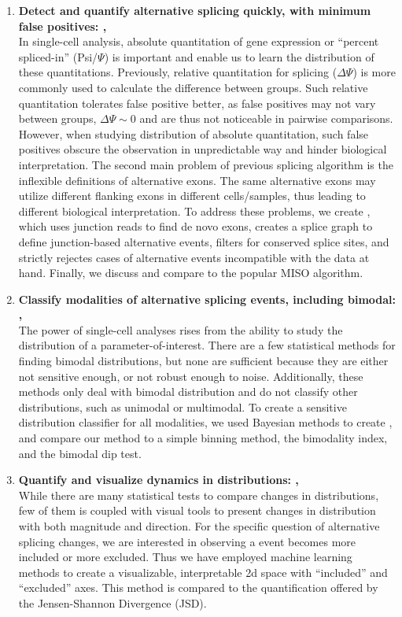 \begin{enumerate}
	\item \textbf{Detect and quantify alternative splicing quickly, with minimum false positives: \outrigger, }\\
	In single-cell analysis, absolute quantitation of gene expression or ``percent spliced-in'' (Psi/$\Psi$) is important and enable us to learn the distribution of these quantitations. Previously, relative quantitation for splicing ($\Delta\Psi$) is more commonly used to calculate the difference between groups. Such relative quantitation tolerates false positive better, as false positives may not vary between groups, $\Delta\Psi \sim 0$ and are thus not noticeable in pairwise comparisons. However, when studying distribution of absolute quantitation, such false positives obscure the observation in unpredictable way and hinder biological interpretation. The second main problem of previous splicing algorithm is the inflexible definitions of alternative exons. The same alternative exons may utilize different flanking exons in different cells/samples, thus leading to different biological interpretation. To address these problems, we create \outrigger, which uses junction reads to find de novo exons, creates a splice graph to define junction-based alternative events, filters for conserved splice sites, and strictly rejectes cases of alternative events incompatible with the data at hand. Finally, we discuss and compare to the popular MISO\cite{Katz:2010iv} algorithm.
	\item \textbf{Classify modalities of alternative splicing events, including bimodal: \anchor, }\\
	The power of single-cell analyses rises from the ability to study the distribution of a parameter-of-interest. There are a few statistical methods for finding bimodal distributions, but none are sufficient because they are either not sensitive enough, or not robust enough to noise. Additionally, these methods only deal with bimodal distribution and do not classify other distributions, such as unimodal or multimodal. To create a sensitive distribution classifier for all modalities, we used Bayesian methods to create \anchor, and compare our method to a simple binning method, the bimodality index\cite{Wang:2009wm}, and the bimodal dip test\cite{Hartigan:1985ca}.
	\item \textbf{Quantify and visualize dynamics in distributions: \bonvoyage,\linebreak {}}\\
	While there are many statistical tests to compare changes in distributions, few of them is coupled with visual tools to present changes in distribution with both magnitude and direction. For the specific question of alternative splicing changes, we are interested in observing a event becomes more included or more excluded. Thus we have employed machine learning methods to create a visualizable, interpretable 2d space with ``included'' and ``excluded'' axes. This method is compared to the quantification offered by the Jensen-Shannon Divergence (JSD)\cite{Cover:2011vn}.
\end{enumerate}

